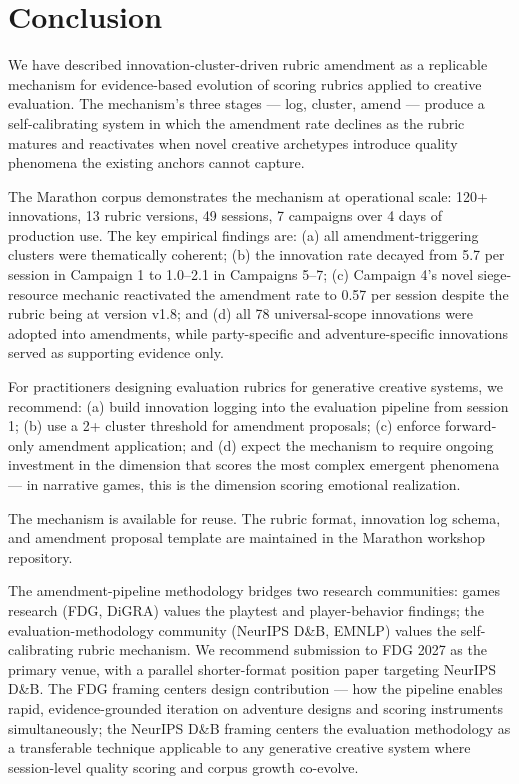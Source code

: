 
\section{Conclusion}
\label{sec:conclusion}

We have described innovation-cluster-driven rubric amendment as a replicable mechanism
for evidence-based evolution of scoring rubrics applied to creative evaluation. The
mechanism's three stages --- log, cluster, amend --- produce a self-calibrating system
in which the amendment rate declines as the rubric matures and reactivates when novel
creative archetypes introduce quality phenomena the existing anchors cannot capture.

The Marathon corpus demonstrates the mechanism at operational scale: 120+ innovations,
13 rubric versions, 49 sessions, 7 campaigns over 4 days of production use. The key
empirical findings are: (a) all amendment-triggering clusters were thematically
coherent; (b) the innovation rate decayed from 5.7 per session in Campaign 1 to
1.0--2.1 in Campaigns 5--7; (c) Campaign 4's novel siege-resource mechanic reactivated
the amendment rate to 0.57 per session despite the rubric being at version v1.8;
and (d) all 78 universal-scope innovations were adopted into amendments, while
party-specific and adventure-specific innovations served as supporting evidence only.

For practitioners designing evaluation rubrics for generative creative systems, we
recommend: (a) build innovation logging into the evaluation pipeline from session 1;
(b) use a 2+ cluster threshold for amendment proposals; (c) enforce forward-only
amendment application; and (d) expect the mechanism to require ongoing investment
in the dimension that scores the most complex emergent phenomena --- in narrative
games, this is the dimension scoring emotional realization.

The mechanism is available for reuse. The rubric format, innovation log schema, and
amendment proposal template are maintained in the Marathon workshop repository.

The amendment-pipeline methodology bridges two research communities: games research
(FDG, DiGRA) values the playtest and player-behavior findings; the evaluation-methodology
community (NeurIPS D\&B, EMNLP) values the self-calibrating rubric mechanism. We
recommend submission to FDG 2027 as the primary venue, with a parallel shorter-format
position paper targeting NeurIPS D\&B. The FDG framing centers design contribution ---
how the pipeline enables rapid, evidence-grounded iteration on adventure designs and
scoring instruments simultaneously; the NeurIPS D\&B framing centers the evaluation
methodology as a transferable technique applicable to any generative creative system
where session-level quality scoring and corpus growth co-evolve.
